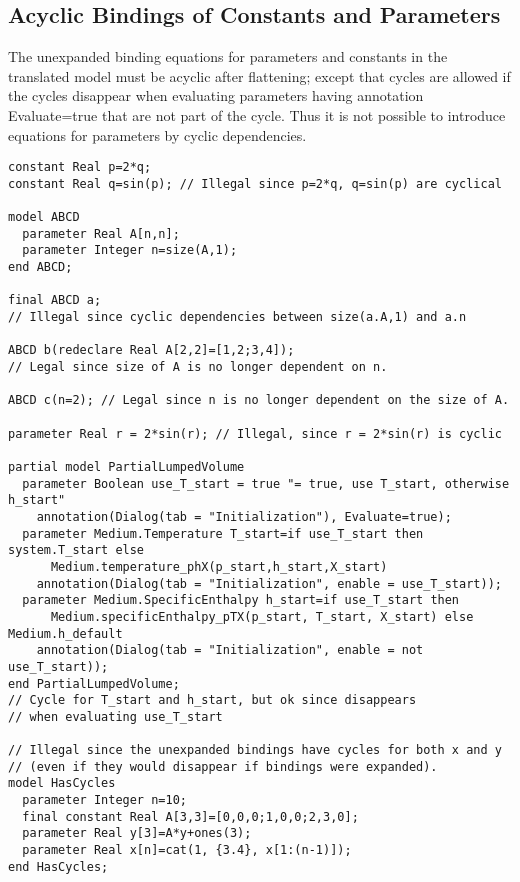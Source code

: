 \subsection{Acyclic Bindings of Constants and Parameters}\label{acyclic-bindings-of-constants-and-parameters}

The unexpanded binding equations for parameters and constants in the
translated model must be acyclic after flattening; except that cycles
are allowed if the cycles disappear when evaluating parameters having
annotation Evaluate=true that are not part of the cycle. Thus it is not
possible to introduce equations for parameters by cyclic dependencies.

\begin{example}
\begin{lstlisting}[language=modelica]
constant Real p=2*q;
constant Real q=sin(p); // Illegal since p=2*q, q=sin(p) are cyclical

model ABCD
  parameter Real A[n,n];
  parameter Integer n=size(A,1);
end ABCD;

final ABCD a;
// Illegal since cyclic dependencies between size(a.A,1) and a.n

ABCD b(redeclare Real A[2,2]=[1,2;3,4]);
// Legal since size of A is no longer dependent on n.

ABCD c(n=2); // Legal since n is no longer dependent on the size of A.

parameter Real r = 2*sin(r); // Illegal, since r = 2*sin(r) is cyclic

partial model PartialLumpedVolume
  parameter Boolean use_T_start = true "= true, use T_start, otherwise h_start"
    annotation(Dialog(tab = "Initialization"), Evaluate=true);
  parameter Medium.Temperature T_start=if use_T_start then system.T_start else
      Medium.temperature_phX(p_start,h_start,X_start)
    annotation(Dialog(tab = "Initialization", enable = use_T_start));
  parameter Medium.SpecificEnthalpy h_start=if use_T_start then
      Medium.specificEnthalpy_pTX(p_start, T_start, X_start) else Medium.h_default
    annotation(Dialog(tab = "Initialization", enable = not use_T_start));
end PartialLumpedVolume;
// Cycle for T_start and h_start, but ok since disappears
// when evaluating use_T_start

// Illegal since the unexpanded bindings have cycles for both x and y
// (even if they would disappear if bindings were expanded).
model HasCycles
  parameter Integer n=10;
  final constant Real A[3,3]=[0,0,0;1,0,0;2,3,0];
  parameter Real y[3]=A*y+ones(3);
  parameter Real x[n]=cat(1, {3.4}, x[1:(n-1)]);
end HasCycles;
\end{lstlisting}
\end{example}

